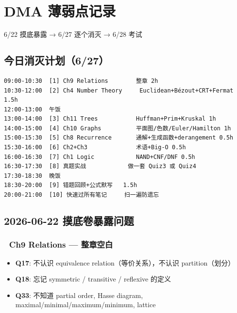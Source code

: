 \documentclass[10pt,a4paper,openany]{ctexbook}
\theoremstyle{definition}
\theoremstyle{remark}
\renewenvironment{quote}
  {\list{}{\leftmargin=1em\rightmargin=0pt\topsep=0.5pt\partopsep=0pt}\item[]}
  {\endlist}
\begin{document}
\newpage

\section{DMA 薄弱点记录}

\begin{quote}
6/22 摸底暴露 → 6/27 逐个消灭 → 6/28 考试

\end{quote}
\vspace{-2pt}

\subsection{今日消灭计划（6/27）}

{\footnotesize\begin{verbatim}
09:00-10:30  [1] Ch9 Relations        整章 2h
10:30-12:00  [2] Ch4 Number Theory     Euclidean+Bézout+CRT+Fermat 1.5h
12:00-13:00  午饭
13:00-14:00  [3] Ch11 Trees           Huffman+Prim+Kruskal 1h
14:00-15:00  [4] Ch10 Graphs          平面图/色数/Euler/Hamilton 1h
15:00-15:30  [5] Ch8 Recurrence       通解+生成函数+derangement 0.5h
15:30-16:00  [6] Ch2+Ch3              术语+Big-O 0.5h
16:00-16:30  [7] Ch1 Logic            NAND+CNF/DNF 0.5h
16:30-17:30  [8] 真题实战            做一套 Quiz3 或 Quiz4
17:30-18:30  晚饭
18:30-20:00  [9] 错题回顾+公式默写   1.5h
20:00-21:00  [10] 快速过所有笔记     扫一遍防遗忘
\end{verbatim}}

\vspace{-2pt}

\subsection{2026-06-22 摸底卷暴露问题}

\subsubsection{🔴 Ch9 Relations — 整章空白}

\begin{itemize}
\item \textbf{Q17}: 不认识 equivalence relation（等价关系），不认识 partition（划分）
\item \textbf{Q18}: 忘记 symmetric / transitive / reflexive 的定义
\item \textbf{Q33}: 不知道 partial order, Hasse diagram, maximal/minimal/maximum/minimum, lattice

\end{itemize}
\end{document}
